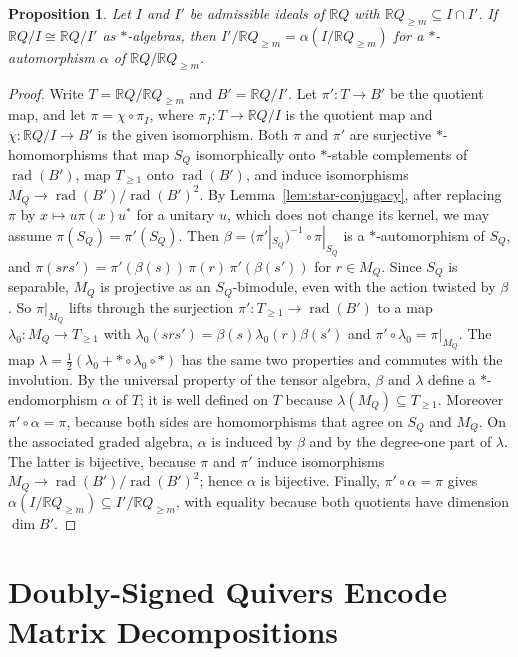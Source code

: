 \documentclass[12pt, a4paper]{report}
\theoremstyle{plain}
\newtheorem{proposition}[theorem]{Proposition}
\theoremstyle{definition}
\theoremstyle{remark}
\theoremstyle{plain}
\newcommand{\rad}[0]{\operatorname{rad}} %
\newcommand{\RR}{\mathbb{R}}
\begin{document}
\begin{proposition}\label{prop:ideal-uniqueness}
Let $I$ and $I'$ be admissible ideals of $\RR Q$ with $\RR Q_{\geq m}\subseteq I\cap I'$. If $\RR Q/I\cong\RR Q/I'$ as $*$-algebras, then $I'/\RR Q_{\geq m}=\alpha(I/\RR Q_{\geq m})$ for a $*$-automorphism $\alpha$ of $\RR Q/\RR Q_{\geq m}$.
\end{proposition}
\begin{proof}
Write $T=\RR Q/\RR Q_{\geq m}$ and $B'=\RR Q/I'$. Let $\pi':T\to B'$ be the quotient map, and let $\pi=\chi\circ\pi_I$, where $\pi_I:T\to\RR Q/I$ is the quotient map and $\chi:\RR Q/I\to B'$ is the given isomorphism. Both $\pi$ and $\pi'$ are surjective $*$-homomorphisms that map $S_Q$ isomorphically onto $*$-stable complements of $\rad(B')$, map $T_{\geq1}$ onto $\rad(B')$, and induce isomorphisms $M_Q\to\rad(B')/\rad(B')^2$. By Lemma~\ref{lem:star-conjugacy}, after replacing $\pi$ by $x\mapsto u\pi(x)u^*$ for a unitary $u$, which does not change its kernel, we may assume $\pi(S_Q)=\pi'(S_Q)$. Then $\beta=(\pi'|_{S_Q})^{-1}\circ\pi|_{S_Q}$ is a $*$-automorphism of $S_Q$, and $\pi(srs')=\pi'(\beta(s))\,\pi(r)\,\pi'(\beta(s'))$ for $r\in M_Q$. Since $S_Q$ is separable, $M_Q$ is projective as an $S_Q$-bimodule, even with the action twisted by $\beta$. So $\pi|_{M_Q}$ lifts through the surjection $\pi':T_{\geq1}\to\rad(B')$ to a map $\lambda_0:M_Q\to T_{\geq1}$ with $\lambda_0(srs')=\beta(s)\lambda_0(r)\beta(s')$ and $\pi'\circ\lambda_0=\pi|_{M_Q}$. The map $\lambda=\frac12(\lambda_0+{*}\circ\lambda_0\circ{*})$ has the same two properties and commutes with the involution. By the universal property of the tensor algebra, $\beta$ and $\lambda$ define a $*$-endomorphism $\alpha$ of $T$; it is well defined on $T$ because $\lambda(M_Q)\subseteq T_{\geq1}$. Moreover $\pi'\circ\alpha=\pi$, because both sides are homomorphisms that agree on $S_Q$ and $M_Q$. On the associated graded algebra, $\alpha$ is induced by $\beta$ and by the degree-one part of $\lambda$. The latter is bijective, because $\pi$ and $\pi'$ induce isomorphisms $M_Q\to\rad(B')/\rad(B')^2$; hence $\alpha$ is bijective. Finally, $\pi'\circ\alpha=\pi$ gives $\alpha(I/\RR Q_{\geq m})\subseteq I'/\RR Q_{\geq m}$, with equality because both quotients have dimension $\dim B'$.
\end{proof}
\chapter{Doubly-Signed Quivers Encode Matrix Decompositions}
\label{chap:indexing}
\end{document}

